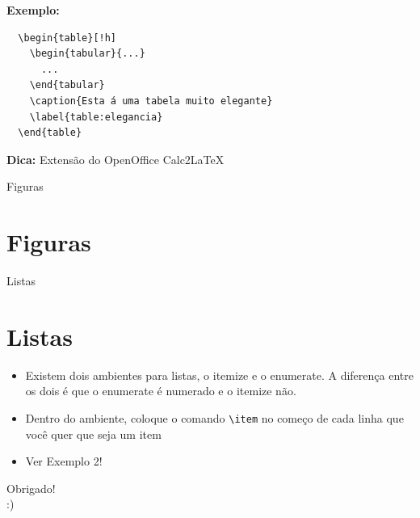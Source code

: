 \documentclass[12pt]{beamer}
\begin{document}
\begin{frame}[fragile]
  \textbf{Exemplo:}
  \begin{verbatim}
  \begin{table}[!h]
    \begin{tabular}{...}
      ...
    \end{tabular}
    \caption{Esta á uma tabela muito elegante}
    \label{table:elegancia}
  \end{table}
  \end{verbatim}

  \textbf{Dica:} Extensão do OpenOffice Calc2LaTeX
\end{frame}

\begin{frame}{Figuras}
  \section{Figuras}
\end{frame}

\begin{frame}[fragile]{Listas}
  \section{Listas}
  \begin{itemize}
    \item Existem dois ambientes para listas, o itemize e o enumerate. A diferença entre os dois é que o enumerate é numerado e o itemize não.
    \item Dentro do ambiente, coloque o comando \verb+\item+ no começo de cada linha que você quer que seja um item
    \item Ver Exemplo 2!
  \end{itemize}
\end{frame}

\begin{frame}
  \begin{center}
    \large Obrigado!\\
    :)
  \end{center}
\end{frame}
\end{document}
